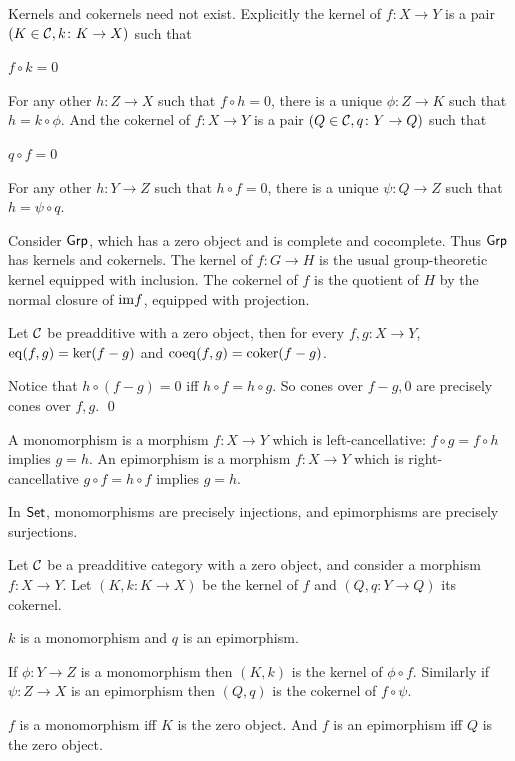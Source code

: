 \edefn

Kernels and cokernels need not exist.
Explicitly the kernel of $f\colon X\to Y$ is a pair $(K\in{{\cal C}},k\colon K\to X)$ such that
\benum
    \item $f\circ k=0$
    \item For any other $h\colon Z\to X$ such that $f\circ h=0$, there is a unique $\phi\colon Z\to K$ such that $h=k\circ\phi$.
\eenum
And the cokernel of $f\colon X\to Y$ is a pair $(Q\in{{\cal C}},q\colon Y\to Q)$ such that
\benum
    \item $q\circ f=0$
    \item For any other $h\colon Y\to Z$ such that $h\circ f=0$, there is a unique $\psi\colon Q\to Z$ such that $h=\psi\circ q$.
\eenum

\bexam

    Consider ${\sf Grp}$, which has a zero object and is complete and cocomplete.
    Thus ${\sf Grp}$ has kernels and cokernels.
    The kernel of $f\colon G\to H$ is the usual group-theoretic kernel equipped with inclusion.
    The cokernel of $f$ is the quotient of $H$ by the normal closure of ${\rm im}f$, equipped with projection.

\eexam

\bprop

    Let ${{\cal C}}$ be preadditive with a zero object, then for every $f,g\colon X\to Y$, ${\rm eq}(f,g)=\ker(f-g)$ and ${\rm coeq}(f,g)={\rm coker}(f-g)$.

\eprop

\bproof

    Notice that $h\circ(f-g)=0$ iff $h\circ f=h\circ g$.
    So cones over $f-g,0$ are precisely cones over $f,g$.
    \qed

\eproof

\bdefn

    A {\emphcolor monomorphism} is a morphism $f\colon X\to Y$ which is left-cancellative: $f\circ g=f\circ h$ implies $g=h$.
    An {\emphcolor epimorphism} is a morphism $f\colon X\to Y$ which is right-cancellative $g\circ f=h\circ f$ implies $g=h$.

\edefn

\bexam

    In ${\sf Set}$, monomorphisms are precisely injections, and epimorphisms are precisely surjections.

\eexam

\bprop

    Let ${{\cal C}}$ be a preadditive category with a zero object, and consider a morphism $f\colon X\to Y$.
    Let $(K,k\colon K\to X)$ be the kernel of $f$ and $(Q,q\colon Y\to Q)$ its cokernel.
    \benum
        \item $k$ is a monomorphism and $q$ is an epimorphism.
        \item If $\phi\colon Y\to Z$ is a monomorphism then $(K,k)$ is the kernel of $\phi\circ f$.
        Similarly if $\psi\colon Z\to X$ is an epimorphism then $(Q,q)$ is the cokernel of $f\circ\psi$.
        \item $f$ is a monomorphism iff $K$ is the zero object.
        And $f$ is an epimorphism iff $Q$ is the zero object.
    \eenum

